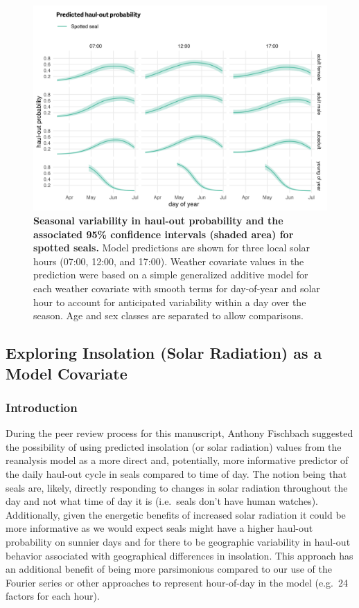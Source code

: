 \documentclass[fleqn,10pt,lineno]{wlpeerj} %
\begin{document}
\begin{figure}
\includegraphics[width=1\linewidth]{../figures/Figure-015} \caption{\textbf{Seasonal variability in haul-out probability and the associated 95\% confidence intervals (shaded area) for spotted seals.} \linebreak Model predictions are shown for three local solar hours (07:00, 12:00, and 17:00). Weather covariate values in the prediction were based on a simple generalized additive model for each weather covariate with smooth terms for day-of-year and solar hour to account for anticipated variability within a day over the season. Age and sex classes are separated to allow comparisons.}\label{fig:spottedPredSE}
\end{figure}

\clearpage

\subsection{Exploring Insolation (Solar Radiation) as a Model Covariate}\label{exploring-insolation-solar-radiation-as-a-model-covariate}

\subsubsection{Introduction}\label{introduction-1}

During the peer review process for this manuscript, Anthony Fischbach suggested
the possibility of using predicted insolation (or solar radiation) values from
the reanalysis model as a more direct and, potentially, more informative
predictor of the daily haul-out cycle in seals compared to time of day. The
notion being that seals are, likely, directly responding to changes in solar radiation
throughout the day and not what time of day it is (i.e.~seals don't have human
watches). Additionally, given the energetic benefits of increased solar
radiation it could be more informative as we would expect seals might have a
higher haul-out probability on sunnier days and for there to be geographic
variability in haul-out behavior associated with geographical differences in
insolation. This approach has an additional benefit of being more parsimonious
compared to our use of the Fourier series or other approaches to represent
hour-of-day in the model (e.g.~24 factors for each hour).
\end{document}
